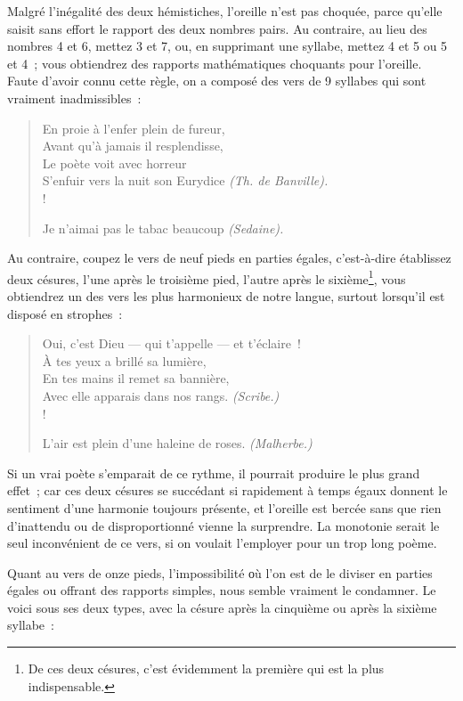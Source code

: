\documentclass[french,twoside]{book} %
\begin{document}
\noindent Malgré l’inégalité des deux hémistiches, l’oreille n’est pas choquée, parce qu’elle saisit sans effort le rapport des deux nombres pairs. Au contraire, au lieu des nombres 4 et 6, mettez 3 et 7, ou, en supprimant une syllabe, mettez 4 et 5 ou 5 et 4 ; vous obtiendrez des rapports mathématiques choquants pour l’oreille. Faute d’avoir connu cette règle, on a composé des vers de 9 syllabes qui sont vraiment inadmissibles :\par


\begin{verse}
En proie à l’enfer plein de fureur,\\
Avant qu’à jamais il resplendisse,\\
Le poète voit avec horreur\\
S’enfuir vers la nuit son Eurydice \emph{(Th. de Banville).}\\!

Je n’aimai pas le tabac beaucoup \emph{(Sedaine).}\\
\end{verse}

\noindent Au contraire, coupez le vers de neuf pieds en parties égales, c’est-à-dire établissez deux césures, l’une après le  troisième pied, l’autre après le sixième\footnote{ De ces deux césures, c’est évidemment la première qui est la plus indispensable.}, vous obtiendrez un des vers les plus harmonieux de notre langue, surtout lorsqu’il est disposé en strophes :\par


\begin{verse}
Oui, c’est Dieu — qui t’appelle — et t’éclaire !\\
À tes yeux a brillé sa lumière,\\
En tes mains il remet sa bannière,\\
Avec elle apparais dans nos rangs. \emph{(Scribe.)}\\!

L’air est plein d’une haleine de roses. \emph{(Malherbe.)}\\
\end{verse}

\noindent Si un vrai poète s’emparait de ce rythme, il pourrait produire le plus grand effet ; car ces deux césures se succédant si rapidement à temps égaux donnent le sentiment d’une harmonie toujours présente, et l’oreille est bercée sans que rien d’inattendu ou de disproportionné vienne la surprendre. La monotonie serait le seul inconvénient de ce vers, si on voulait l’employer pour un trop long poème.\par
Quant au vers de onze pieds, l’impossibilité οù l’on est de le diviser en parties égales ou offrant des rapports simples, nous semble vraiment le condamner. Le voici sous ses deux types, avec la césure après la cinquième ou après la sixième syllabe :\par
\end{document}
